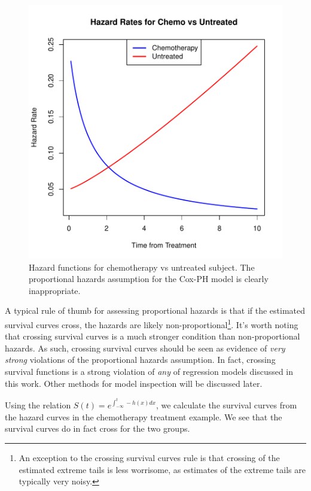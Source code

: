 \documentclass[a4paper]{article}
\begin{document}
\begin{figure}[H]
\begin{center}
\includegraphics{StatisticalBackground-006}
\caption{Hazard functions for chemotherapy vs untreated subject. The proportional hazards assumption for the Cox-PH model is clearly inappropriate.}
\end{center}
\end{figure}
    
    A typical rule of thumb for assessing proportional hazards is that if the estimated survival curves cross, the hazards are likely non-proportional\footnote{An exception to the crossing survival curves rule is that crossing of the estimated extreme tails is less worrisome, as estimates of the extreme tails are typically very noisy.}. It's worth noting that crossing survival curves is a much stronger condition than non-proportional hazards. As such, crossing survival curves should be seen as evidence of \emph{very strong} violations of the proportional hazards assumption. In fact, crossing survival functions is a strong violation of \emph{any} of regression models discussed in this work. Other methods for model inspection will be discussed later. 
    
    Using the relation 
    $S(t) = e^{\int_{-\infty}^t -h(x) dx }$,
    we calculate the survival curves from the hazard curves in the chemotherapy treatment example. We see that the survival curves do in fact cross for the two groups. 
    
\end{document}
